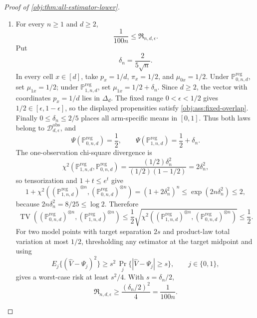 \begin{proof}[Proof of \cref{obj:thm:all-estimator-lower}]
\begin{enumerate}
Choose \(d_{\log}\) so that
\[
r\ge d_{\log}\quad\Longrightarrow\quad L_r\le\frac r2,
\]
and choose \(n_{\mathrm{tail}}\ge2\) so that, for every
\(n\ge n_{\mathrm{tail}}\),
\[
8\exp\{-n(1-\log2)\}\le\frac{\gamma_{\mathrm{JHW}}}{2n},
\qquad
8\exp\{-n(1-\log2)\}\le\frac{\gamma_{\mathrm{JHW}}}{2}.
\]
Set
\[
d_\star=\max\{d_{\mathrm{dense}},d_{\log}\},
\qquad
\Xi_\star=\max\{d_\star,n_{\mathrm{tail}}\},
\]
and
\[
c_\epsilon=
\min\left\{
\gamma_{\mathrm{dense},\epsilon},
\frac{\gamma_{\mathrm{JHW}}}{64},
\frac{1}{100\Xi_\star}
\right\}>0.
\]

\item
For every \(n\ge1\) and \(d\ge2\),
\[
\frac{1}{100n}\le \mathfrak R_{n,d,\epsilon}.
\]
Put
\[
\delta_n=\frac{2}{5\sqrt n}.
\]
In every cell \(x\in[d]\), take \(p_x=1/d\), \(\pi_x=1/2\), and
\(\mu_{0x}=1/2\).  Under \(\mathbb P^{\mathrm{reg}}_{0,n,d}\), set
\(\mu_{1x}=1/2\); under \(\mathbb P^{\mathrm{reg}}_{1,n,d}\), set
\(\mu_{1x}=1/2+\delta_n\).  Since \(d\ge2\), the vector with coordinates \(p_x=1/d\) lies in
\(\Delta_d\).  The fixed range \(0<\epsilon<1/2\) gives
\(1/2\in[\epsilon,1-\epsilon]\), so the displayed propensities satisfy
\cref{obj:ass:fixed-overlap}.  Finally \(0\le\delta_n\le2/5\) places all
arm-specific means in \([0,1]\).  Thus both laws belong to
\(\mathcal D_{d,\epsilon}^{\mathrm{obs}}\), and
\[
\Psi(\mathbb P^{\mathrm{reg}}_{0,n,d})=\frac12,
\qquad
\Psi(\mathbb P^{\mathrm{reg}}_{1,n,d})=\frac12+\delta_n .
\]
The one-observation chi-square divergence is
\[
\chi^2(\mathbb P^{\mathrm{reg}}_{1,n,d},\mathbb P^{\mathrm{reg}}_{0,n,d})
=
\frac{(1/2)\delta_n^2}{(1/2)(1-1/2)}
=
2\delta_n^2,
\]
so tensorization and \(1+t\le e^t\) give
\[
1+
\chi^2\!\left(
(\mathbb P^{\mathrm{reg}}_{1,n,d})^{\otimes n},
(\mathbb P^{\mathrm{reg}}_{0,n,d})^{\otimes n}
\right)
=
(1+2\delta_n^2)^n
\le
\exp(2n\delta_n^2)
\le
2,
\]
because \(2n\delta_n^2=8/25\le\log2\).  Therefore
\[
\operatorname{TV}\!\left(
(\mathbb P^{\mathrm{reg}}_{0,n,d})^{\otimes n},
(\mathbb P^{\mathrm{reg}}_{1,n,d})^{\otimes n}
\right)
\le
\frac12
\sqrt{
\chi^2\!\left(
(\mathbb P^{\mathrm{reg}}_{1,n,d})^{\otimes n},
(\mathbb P^{\mathrm{reg}}_{0,n,d})^{\otimes n}
\right)}
\le
\frac12 .
\]
For two model points with target separation \(2s\) and product-law total
variation at most \(1/2\), thresholding any estimator at the target midpoint
and using
\[
E_j\{(\widehat V-\Psi_j)^2\}
\ge
s^2\,\Pr_j\{|\widehat V-\Psi_j|\ge s\},
\qquad j\in\{0,1\},
\]
gives a worst-case risk at least \(s^2/4\).  With \(s=\delta_n/2\),
\[
\mathfrak R_{n,d,\epsilon}
\ge
\frac{(\delta_n/2)^2}{4}
=
\frac{1}{100n}.
\]


\end{enumerate}
\end{proof}
